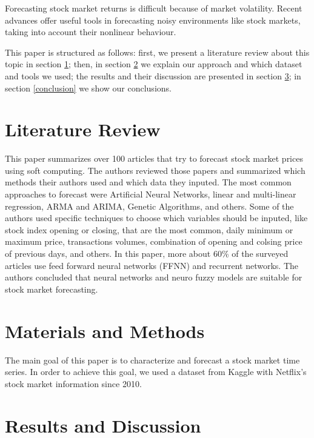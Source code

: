 \documentclass[conference]{IEEEtran}
\begin{document}
Forecasting stock market returns is difficult because of market volatility. Recent advances offer useful tools in forecasting noisy environments like stock markets, taking into account their nonlinear behaviour.

This paper is structured as follows: first, we present a literature review about this topic in section \ref{literaturereview}; then, in section \ref{methods} we explain our approach and which dataset and tools we used; the results and their discussion are presented in section \ref{resultsdiscussion}; in section \ref{conclusion} we show our conclusions.

\section{Literature Review}
\label{literaturereview}

This paper \cite{george2009} summarizes over 100 articles that try to forecast stock market prices using soft computing. The authors reviewed those papers and summarized which methods their authors used and which data they inputed. The most common approaches to forecast were Artificial Neural Networks, linear and multi-linear regression, ARMA and ARIMA, Genetic Algorithms, and others. Some of the authors used specific techniques to choose which variables should be inputed, like stock index opening or closing, that are the most common, daily minimum or maximum price, transactions volumes, combination of opening and colsing price of previous days, and others. In this paper, more about 60\% of the surveyed articles use feed forward neural networks (FFNN) and recurrent networks. The authors concluded that neural networks and neuro fuzzy models are suitable for stock market forecasting.

\section{Materials and Methods}
\label{methods}

The main goal of this paper is to characterize and forecast a stock market time series. In order to achieve this goal, we used a dataset from Kaggle with Netflix's stock market information since 2010.




\section{Results and Discussion}
\label{resultsdiscussion}
\end{document}
